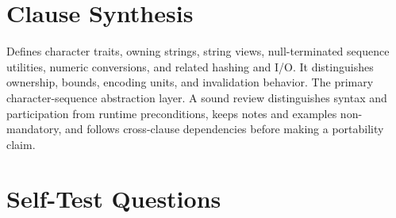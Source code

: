 \documentclass[11pt,letterpaper]{article}
\begin{document}
\section{Clause Synthesis}
\begin{CornellReferenceOrientationBox}Defines character traits, owning strings, string views, null-terminated sequence utilities, numeric conversions, and related hashing and I/O. It distinguishes ownership, bounds, encoding units, and invalidation behavior. The primary character-sequence abstraction layer. A sound review distinguishes syntax and participation from runtime preconditions, keeps notes and examples non-mandatory, and follows cross-clause dependencies before making a portability claim.\end{CornellReferenceOrientationBox}
\section{Self-Test Questions}
\end{document}

